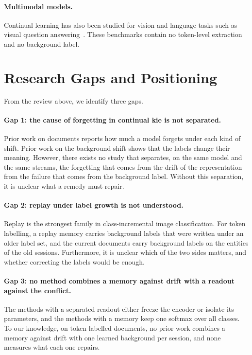 \paragraph{Multimodal models.} Continual learning has also been studied for
vision-and-language tasks such as visual question
answering~\citep{srinivasan2022climb,zhang2025clcrossvqa,lei2023clove}. These benchmarks
contain no token-level extraction and no background label.

\section{Research Gaps and Positioning}
\label{sec:c2-s8}

From the review above, we identify three gaps.

\paragraph{Gap 1: the cause of forgetting in continual \gls{kie} is not separated.} Prior
work on documents reports how much a model forgets under each kind of shift. Prior work on
the background shift shows that the labels change their meaning. However, there exists no
study that separates, on the same model and the same streams, the forgetting that comes
from the drift of the representation from the failure that comes from the background
label. Without this separation, it is unclear what a remedy must repair.

\paragraph{Gap 2: replay under label growth is not understood.} Replay is the strongest
family in class-incremental image classification. For token labelling, a replay memory
carries background labels that were written under an older label set, and the current
documents carry background labels on the entities of the old sessions. Furthermore, it is
unclear which of the two sides matters, and whether correcting the labels would be enough.

\paragraph{Gap 3: no method combines a memory against drift with a readout against the
conflict.} The methods with a separated readout either freeze the encoder or isolate its
parameters, and the methods with a memory keep one softmax over all classes. To our
knowledge, on token-labelled documents, no prior work combines a memory against drift with
one learned background per session, and none measures what each one repairs.

